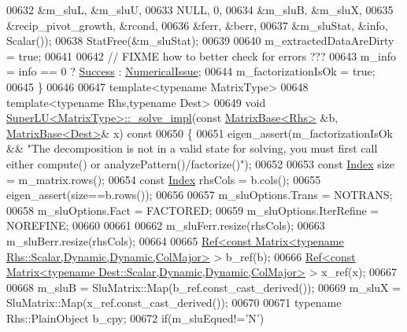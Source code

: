 \begin{DoxyCode}
00632                 &m\_sluL, &m\_sluU,
00633                 NULL, 0,
00634                 &m\_sluB, &m\_sluX,
00635                 &recip\_pivot\_growth, &rcond,
00636                 &ferr, &berr,
00637                 &m\_sluStat, &info, Scalar());
00638   StatFree(&m\_sluStat);
00639 
00640   m\_extractedDataAreDirty = \textcolor{keyword}{true};
00641 
00642   \textcolor{comment}{// FIXME how to better check for errors ???}
00643   m\_info = info == 0 ? \hyperlink{group__enums_gga85fad7b87587764e5cf6b513a9e0ee5ea52581b035f4b59c203b8ff999ef5fcea}{Success} : \hyperlink{group__enums_gga85fad7b87587764e5cf6b513a9e0ee5eaaf9b736d310a664e7729d163a035cc5f}{NumericalIssue};
00644   m\_factorizationIsOk = \textcolor{keyword}{true};
00645 \}
00646 
00647 \textcolor{keyword}{template}<\textcolor{keyword}{typename} MatrixType>
00648 \textcolor{keyword}{template}<\textcolor{keyword}{typename} Rhs,\textcolor{keyword}{typename} Dest>
00649 \textcolor{keywordtype}{void} \hyperlink{class_eigen_1_1_super_l_u}{SuperLU<MatrixType>::\_solve\_impl}(\textcolor{keyword}{const} 
      \hyperlink{group___core___module_class_eigen_1_1_matrix_base}{MatrixBase<Rhs>} &b, \hyperlink{group___core___module_class_eigen_1_1_matrix_base}{MatrixBase<Dest>}& x)\textcolor{keyword}{ const}
00650 \textcolor{keyword}{}\{
00651   eigen\_assert(m\_factorizationIsOk && \textcolor{stringliteral}{"The decomposition is not in a valid state for solving, you must
       first call either compute() or analyzePattern()/factorize()"});
00652 
00653   \textcolor{keyword}{const} \hyperlink{namespace_eigen_a62e77e0933482dafde8fe197d9a2cfde}{Index} size = m\_matrix.rows();
00654   \textcolor{keyword}{const} \hyperlink{namespace_eigen_a62e77e0933482dafde8fe197d9a2cfde}{Index} rhsCols = b.cols();
00655   eigen\_assert(size==b.rows());
00656 
00657   m\_sluOptions.Trans = NOTRANS;
00658   m\_sluOptions.Fact = FACTORED;
00659   m\_sluOptions.IterRefine = NOREFINE;
00660   
00661 
00662   m\_sluFerr.resize(rhsCols);
00663   m\_sluBerr.resize(rhsCols);
00664   
00665   \hyperlink{group___core___module_class_eigen_1_1_ref}{Ref<const Matrix<typename Rhs::Scalar,Dynamic,Dynamic,ColMajor>}
       > b\_ref(b);
00666   \hyperlink{group___core___module_class_eigen_1_1_ref}{Ref<const Matrix<typename Dest::Scalar,Dynamic,Dynamic,ColMajor>}
       > x\_ref(x);
00667   
00668   m\_sluB = SluMatrix::Map(b\_ref.const\_cast\_derived());
00669   m\_sluX = SluMatrix::Map(x\_ref.const\_cast\_derived());
00670   
00671   \textcolor{keyword}{typename} Rhs::PlainObject b\_cpy;
00672   \textcolor{keywordflow}{if}(m\_sluEqued!=\textcolor{charliteral}{'N'})

\end{DoxyCode}
